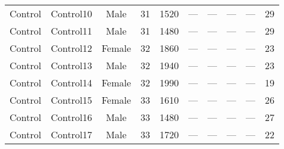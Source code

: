 \begin{sidewaystable}[h]
\begin{tabular}{ccccccp{2cm}p{2cm}cc}
Control & Control10 & Male & 31 & 1520 & — & — & — & — & 29 \\
Control & Control11 & Male & 31 & 1480 & — & — & — & — & 29 \\
Control & Control12 & Female & 32 & 1860 & — & — & — & — & 23 \\
Control & Control13 & Male & 32 & 1940 & — & — & — & — & 23 \\
Control & Control14 & Female & 32 & 1990 & — & — & — & — & 19 \\
Control & Control15 & Female & 33 & 1610 & — & — & — & — & 26 \\
Control & Control16 & Male & 33 & 1480 & — & — & — & — & 27 \\
Control & Control17 & Male & 33 & 1720 & — & — & — & — & 22 \\

\hline %
\end{tabular}
\label{tab:2demograph}
\end{sidewaystable}
